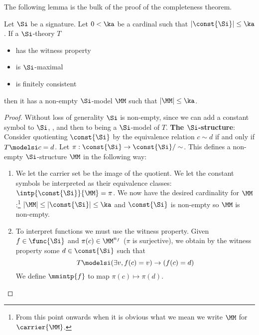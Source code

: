 The following lemma is the bulk of the proof of the completeness theorem.
\begin{lem}
    Let $\Si$ be a signature.
    Let $0 < \ka$ be a cardinal such that $|\const{\Si}| \leq \ka$.
    If a $\Si$-theory $T$ 
    \begin{itemize}
        \item has the witness property
        \item is $\Si$-maximal
        \item is finitely consistent
    \end{itemize}
    then it has a non-empty $\Si$-model $\MM$ such that $|\MM| \leq \ka$.
\end{lem}
\begin{proof}
    Without loss of generality $\Si$ is non-empty, 
    since we can add a constant symbol to $\Si$, 
    , and then 
     to 
    being a $\Si$-model of $T$.
    \textbf{The $\Si$-structure}: 
    Consider quotienting $\const{\Si}$ by the equivalence relation
    $c \sim d$ if and only if $T \modelsi c = d$.
    Let $\pi : \const{\Si} \to \const{\Si} / \sim $.
    This defines a non-empty $\Si$-structure $\MM$ in the following way:
    \begin{enumerate}
        \item We let the carrier set be the image of the quotient.
        We let the constant symbols be interpreted as their equivalence classes:
        $\intp{\const{\Si}}{\MM} = \pi$.
        We now have the desired cardinality for $\MM$:\footnote{From 
            this point onwards when it is obvious what we mean 
            we write $\MM$ for $\carrier{\MM}$.} 
        $|{\MM}| \leq |\const{\Si}| \leq \ka$
        and $\const{\Si}$ is non-empty so $\MM$ is non-empty.
        \item To interpret functions we must use the witness property.
        Given $f \in \func{\Si}$ and $\pi(c) \in \MM^{n_f}$
        ($\pi$ is surjective),
        we obtain by the witness property some $d \in \const{\Si}$
        such that \[T \modelsi (\exists v, f(c) = v) \to (f(c) = d)\]
        We define $\mmintp{f}$ to map $\pi(c) \mapsto \pi(d)$.
        

\end{enumerate}
\end{proof}
